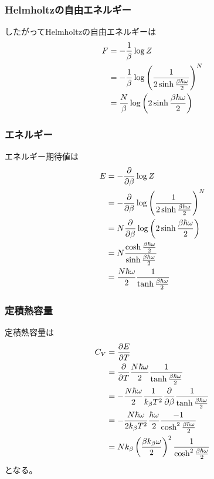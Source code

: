 \documentclass[dvipdfmx, 11pt, a4paper]{jsarticle}
\theoremstyle{definition}
\begin{document}
\subsubsection{Helmholtzの自由エネルギー}
    したがってHelmholtzの自由エネルギーは
    \begin{align}
        F &= -\frac{1}{\beta} \log Z \notag \\
        &= -\frac{1}{\beta} \log \left( \frac{1}{2\sinh \frac{\beta \hbar \omega}{2}} \right)^N \notag \\
        &= \frac{N}{\beta} \log \left( 2\sinh \frac{\beta \hbar \omega}{2} \right) 
    \end{align}
\subsubsection{エネルギー}
    エネルギー期待値は
    \begin{align}
        E &= - \frac{\partial }{\partial \beta} \log Z \notag \\
        &= - \frac{\partial }{\partial \beta} \log \left( \frac{1}{2\sinh \frac{\beta \hbar \omega}{2}} \right)^N \notag \\
        &= N \frac{\partial }{\partial \beta} \log \left( 2\sinh \frac{\beta \hbar \omega}{2} \right) \notag \\
        &= N \frac{\cosh \frac{\beta \hbar \omega}{2}}{\sinh \frac{\beta \hbar \omega}{2}} \notag \\
        &= \frac{N\hbar \omega}{2} \frac{1}{\tanh \frac{\beta \hbar \omega }{2}}
    \end{align}
\subsubsection{定積熱容量}
    定積熱容量は
    \begin{align}
        C_V &= \frac{\partial E}{\partial T} \notag \\
        &= \frac{\partial}{\partial T} \frac{N\hbar \omega}{2} \frac{1}{\tanh \frac{\beta \hbar \omega }{2}} \notag \\
        &= -\frac{N\hbar \omega}{2} \frac{1}{k_\beta T^2}\frac{\partial}{\partial \beta} \frac{1}{\tanh \frac{\beta \hbar \omega }{2}} \notag \\
        &= -\frac{N\hbar \omega}{2k_\beta T^2} \frac{\hbar \omega}{2} \frac{-1}{\cosh^2 \frac{\beta \hbar \omega }{2}} \notag \\
        &= Nk_\beta  \left( \frac{\beta k_\beta \omega}{2} \right)^2 \frac{1}{\cosh^2 \frac{\beta \hbar \omega }{2}}
    \end{align}
    となる。
\end{document}
